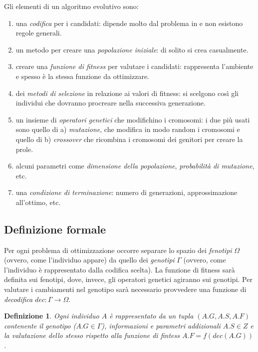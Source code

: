 \documentclass[10pt,a4paper]{article}
\newtheorem{definition}{Definizione}
\begin{document}
Gli elementi di un algoritmo evolutivo sono:

\begin{enumerate}
\item{una \emph{codifica} per i candidati: dipende molto dal problema in e non esistono regole generali.}
\item{un metodo per creare una \emph{popolazione iniziale}: di solito si crea casualmente.}
\item{creare una \emph{funzione di fitness} per valutare i candidati: rappresenta l'ambiente e spesso è la stessa funzione da ottimizzare.}
\item{dei \emph{metodi di selezione} in relazione ai valori di fitness: si scelgono così gli individui che dovranno procreare nella successiva generazione.}
\item{un insieme di \emph{operatori genetici} che modifichino i cromosomi: i due più usati sono quello di a) \emph{mutazione}, che modifica in modo random i cromosomi e quello di b) \emph{crossover} che ricombina i cromosomi dei genitori per creare la prole.}
\item{alcuni parametri come \emph{dimensione della popolazione}, \emph{probabilità di mutazione}, etc.}
\item{una \emph{condizione di terminazione}: numero di generazioni, approssimazione all'ottimo, etc.}
\end{enumerate}

\subsection{Definizione formale}

Per ogni problema di ottimizzazione occorre separare lo spazio dei \emph{fenotipi} $\Omega$ (ovvero, come l'individuo appare) da quello dei \emph{genotipi} $\Gamma$ (ovvero, come l'individuo è rappresentato dalla codifica scelta). La funzione di fitness sarà definita sui fenotipi, dove, invece, gli operatori genetici agiranno sui genotipi. Per valutare i cambiamenti nel genotipo sarà necessario provvedere una funzione di \emph{decodifica} $dec: \Gamma \to \Omega$.

\begin{definition}
Ogni \emph{individuo} $A$ è rappresentato da un tupla $(A.G, A.S, A.F)$ contenente il genotipo ($A.G \in \Gamma$), informazioni e parametri addizionali $A.S \in Z$ e la valutazione dello stesso rispetto alla funzione di fintess $A.F = f(dec(A.G))$.
\end{definition}
\end{document}
